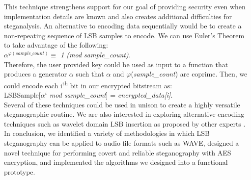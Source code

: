 This technique strengthens support for our goal of providing security even when implementation details are known and also creates additional difficulties for steganalysis. An alternative to encoding data sequentially would be to create a non-repeating sequence of LSB samples to encode. We can use Euler's Theorem to take advantage of the following: \\ \textit{$\alpha ^{\varphi(sample\_count)} \equiv$ 1 (mod sample\_count).}
\vspace{2 mm} \\
Therefore, the user provided key could be used as input to a function that produces a generator $\alpha$ such that $\alpha$ and $\varphi$(\textit{sample\_count}) are coprime. Then, we could encode each i\textsuperscript{th} bit in our encrypted bitstream as: \\
LSBSample[\textit{$\alpha ^{i}$ mod sample\_count}] = \textit{encrypted\_data[i]}.
\vspace{2 mm} \\
Several of these techniques could be used in unison to create a highly versatile steganographic routine. We are also interested in exploring alternative encoding techniques such as wavelet domain LSB insertion as proposed by other experts \cite{paper7}. In conclusion, we identified a variety of methodologies in which LSB steganography can be applied to audio file formats such as WAVE, designed a novel technique for performing covert and reliable steganography with AES encryption, and implemented the algorithms we designed into a functional prototype.
